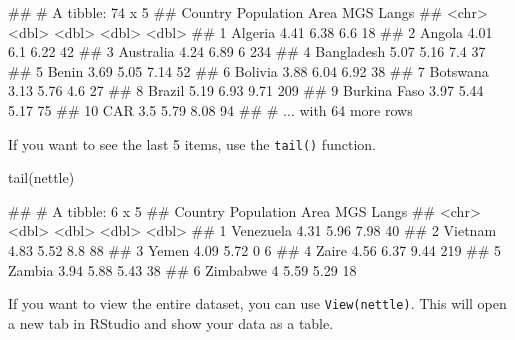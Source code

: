 \documentclass[
]{book}
\newenvironment{Shaded}{\begin{snugshade}}{\end{snugshade}}
\newcommand{\FunctionTok}[1]{\textcolor[rgb]{0.00,0.00,0.00}{#1}}
\newcommand{\NormalTok}[1]{#1}
\begin{document}
\begin{Shaded}
\begin{Highlighting}[]
\NormalTok{\#\# \# A tibble: 74 x 5}
\NormalTok{\#\#    Country      Population  Area   MGS Langs}
\NormalTok{\#\#    \textless{}chr\textgreater{}             \textless{}dbl\textgreater{} \textless{}dbl\textgreater{} \textless{}dbl\textgreater{} \textless{}dbl\textgreater{}}
\NormalTok{\#\#  1 Algeria            4.41  6.38  6.6     18}
\NormalTok{\#\#  2 Angola             4.01  6.1   6.22    42}
\NormalTok{\#\#  3 Australia          4.24  6.89  6      234}
\NormalTok{\#\#  4 Bangladesh         5.07  5.16  7.4     37}
\NormalTok{\#\#  5 Benin              3.69  5.05  7.14    52}
\NormalTok{\#\#  6 Bolivia            3.88  6.04  6.92    38}
\NormalTok{\#\#  7 Botswana           3.13  5.76  4.6     27}
\NormalTok{\#\#  8 Brazil             5.19  6.93  9.71   209}
\NormalTok{\#\#  9 Burkina Faso       3.97  5.44  5.17    75}
\NormalTok{\#\# 10 CAR                3.5   5.79  8.08    94}
\NormalTok{\#\# \# ... with 64 more rows}
\end{Highlighting}
\end{Shaded}

If you want to see the last 5 items, use the \texttt{tail()} function.

\begin{Shaded}
\begin{Highlighting}[]
\FunctionTok{tail}\NormalTok{(nettle)}
\end{Highlighting}
\end{Shaded}

\begin{Shaded}
\begin{Highlighting}[]
\NormalTok{\#\# \# A tibble: 6 x 5}
\NormalTok{\#\#   Country   Population  Area   MGS Langs}
\NormalTok{\#\#   \textless{}chr\textgreater{}          \textless{}dbl\textgreater{} \textless{}dbl\textgreater{} \textless{}dbl\textgreater{} \textless{}dbl\textgreater{}}
\NormalTok{\#\# 1 Venezuela       4.31  5.96  7.98    40}
\NormalTok{\#\# 2 Vietnam         4.83  5.52  8.8     88}
\NormalTok{\#\# 3 Yemen           4.09  5.72  0        6}
\NormalTok{\#\# 4 Zaire           4.56  6.37  9.44   219}
\NormalTok{\#\# 5 Zambia          3.94  5.88  5.43    38}
\NormalTok{\#\# 6 Zimbabwe        4     5.59  5.29    18}
\end{Highlighting}
\end{Shaded}

If you want to view the entire dataset, you can use \texttt{View(nettle)}. This will open a new tab in RStudio and show your data as a table.
\end{document}
